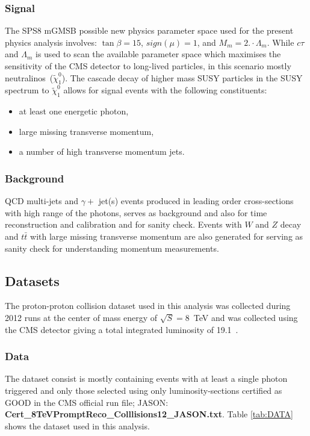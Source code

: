 \subsubsection*{Signal}
The SPS8 mGMSB possible new physics parameter space used for the present physics analysis involves: $\tan\beta = 15$, $sign(\mu) = 1$, and $M_{m} = 2.\cdot \Lambda_{m}$. While $c\tau$ and $\Lambda_{m}$ is used to scan the available parameter space which maximises the sensitivity of the CMS detector to long-lived particles, in this scenario mostly neutralinos~($\tilde{\chi}^{0}_{1}$). The cascade decay of higher mass SUSY particles in the SUSY spectrum to $\tilde{\chi}^{0}_{1}$ allows for signal events with the following constituents:
\begin{itemize}
\item at least one energetic photon,
\item large missing transverse momentum,
\item a number of high transverse momentum jets.
\end{itemize}
\subsubsection*{Background}
QCD multi-jets and $\gamma +$ jet(s) events produced in leading order cross-sections with high \pt range of the photons, serves as background and also for time reconstruction and calibration and for sanity check. Events with $W$  and $Z$ decay  and $t\bar{t}$ with large missing transverse momentum are also generated for serving as sanity check for understanding momentum measurements.
\subsection{Datasets}
The proton-proton collision dataset used in this analysis was collected during 2012 runs at the center of mass energy of  $\sqrt{S} = 8$~TeV  and was collected using the CMS detector giving a total integrated luminosity of 19.1~\fbinv .
\subsubsection*{Data}
The dataset consist is mostly containing events with at least a single photon triggered and only those selected using only luminosity-sections certified as GOOD in the CMS official run file; JASON: \textbf{Cert\_8TeVPromptReco\_Colllisions12\_JASON.txt}. Table \ref{tab:DATA} shows the dataset used in this analysis.

